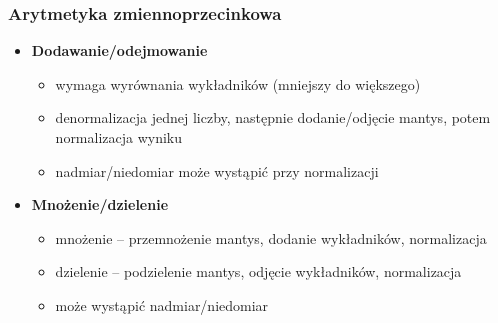 \subsubsection{Arytmetyka zmiennoprzecinkowa}
\begin{itemize}
\item \textbf{Dodawanie/odejmowanie}
	\begin{itemize}
	\item wymaga wyrównania wykładników (mniejszy do większego)
	\item denormalizacja jednej liczby, następnie dodanie/odjęcie mantys, potem normalizacja wyniku
	\item nadmiar/niedomiar może wystąpić przy normalizacji
	\end{itemize}
\item \textbf{Mnożenie/dzielenie}
	\begin{itemize}
	\item mnożenie -- przemnożenie mantys, dodanie wykładników, normalizacja
	\item dzielenie -- podzielenie mantys, odjęcie wykładników, normalizacja
	\item może wystąpić nadmiar/niedomiar
	\end{itemize}
\end{itemize}

